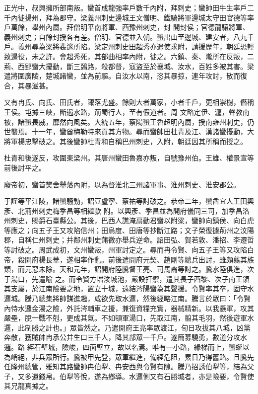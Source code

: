 \begin{pinyinscope}
 正光中，叔興擁所部南叛。蠻首成龍強率戶數千內附，拜刺史；蠻帥田牛生率戶二千內徙揚州，拜為郡守。梁義州刺史邊城王文僧明、鐵騎將軍邊城太守田官德等率戶萬餘，舉州內屬。拜僧明平南將軍、西豫州刺史，封
 開封侯；官德龍驤將軍、義州刺史；自餘封授各有差。僧明、官德並入朝。蠻出山至邊城、建安者，八九千戶。義州尋為梁將裴邃所陷。梁定州刺史田超秀亦遣使求附，請援歷年，朝廷恐輕致邊役，未之許。會超秀死，其部曲相率內附，徙之。六鎮、秦、隴所在反叛，二荊、西郢蠻大擾動，斷三鵶路，殺都督，寇盜至於襄城、汝水，百姓多被其害。梁遣將圍廣陵，楚城諸蠻，並為前驅。自汝水以南，恣其暴掠，連年攻討，散而復合，其暴滋甚。



 又有冉氏、向氏、田氏者，陬落尤盛。餘則大者萬家，小者千戶，更相崇樹，僭稱王侯。屯據三峽，斷遏水路，荊蜀行人，至有假道者。周
 文略定伊、瀍，聲教南被，諸蠻畏威，靡然向風矣。大統五年，蔡陽蠻王魯超明內屬，授南雍州刺史，仍世襲焉。十一年，蠻酋梅勒特來貢其方物。尋而蠻帥田杜青及江、漢諸蠻擾動，大將軍楊忠擊破之。其後蠻帥杜青和自稱巴州刺史，入附，朝廷因其所稱而授之。



 杜青和後遂反，攻圍東梁州。其唐州蠻田魯嘉亦叛，自號豫州伯。王雄、權景宣等前後討平之。



 廢帝初，蠻首樊舍舉落內附，以為督淮北三州諸軍事、淮州刺史、淮安郡公。



 于謹等平江陵，諸蠻騷動，詔豆盧寧、蔡祐等討破之。恭帝二年，蠻酋宜人王田興彥、北荊州刺史梅季昌等相繼款
 附。以興彥、季昌並為開府儀同三司，加季昌洛州刺史，賜爵石臺縣公。其後，巴西人譙淹扇動君蠻以附梁，蠻帥向鎮侯、向白虎等應之；向五子王又攻陷信州；田烏度、田唐等抄斷江路；文子榮復據荊州之汶陽郡，自稱仁州刺史；并鄰州刺史蒲微亦舉兵逆命。詔田弘、賀若敦、潘招、李遷哲等討破之。周武成初，文州蠻叛，州軍討定之。尋而冉令賢、向五子王等又攻陷白帝，殺開府楊長華，遂相率作亂。前後遣開府元契、趙剛等總兵出討，雖頗翦其族類，而元惡未除。天和元年，詔開府陸騰督王亮、司馬裔等討之。騰水陸俱進，次于湯口，先遣喻
 之。而令賢方增浚城池，嚴設扞禦，遣其長子西黎、次子南王領其支屬，於江南險要之地，置立十城，遠結涔陽蠻為其聲援。令賢率其卒，固守水邏城。騰乃總集將帥謀進趣，咸欲先取水邏，然後經略江南。騰言於眾曰：「令賢內恃水邏金湯之險，外託涔輔車之援，兼復資糧充實，器械精新。以我懸軍，攻其嚴壘，脫一戰不剋，更成其氣。不如頓軍湯口，先取江南，翦其毛羽，然後遊軍水邏，此制勝之計也。」眾皆然之。乃遣開府王亮率眾渡江，旬日攻拔其八城，凶黨奔散，獲賊帥冉承公并生口三千人，降其部眾一千戶。遂簡募驍勇，數道分攻水邏。路
 經石壁城，險峻，四面壁立，故以名焉。唯有一小路，緣梯而上，蠻蜒以為峭絕，非兵眾所行。騰被甲先登，眾軍繼進，備經危阻，累日乃得舊路。且騰先任隆州總管，雅知其路蠻帥冉伯犁、冉安西與令賢有隙。騰乃招誘伯犁等，結為父子，又多遺錢帛。伯犁等悅，遂為鄉導。水邏側又有石勝城者，亦是險要，令賢使其兄龍真據之。




\end{pinyinscope}
